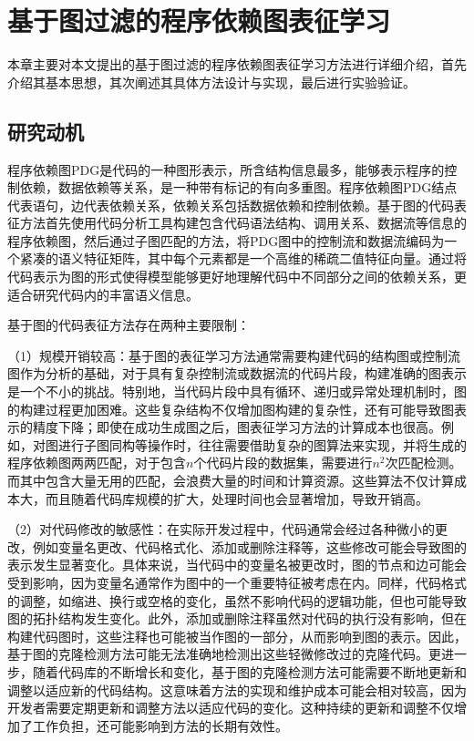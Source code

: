 \chapter{基于图过滤的程序依赖图表征学习}
\label{chap:PDG}
本章主要对本文提出的基于图过滤的程序依赖图表征学习方法进行详细介绍，首先介绍其基本思想，其次阐述其具体方法设计与实现，最后进行实验验证。

\section{研究动机}
\label{sec:PDGMotivation}

程序依赖图PDG是代码的一种图形表示，所含结构信息最多，能够表示程序的控制依赖，数据依赖等关系，是一种带有标记的有向多重图。程序依赖图PDG结点代表语句，边代表依赖关系，依赖关系包括数据依赖和控制依赖。基于图的代码表征方法首先使用代码分析工具构建包含代码语法结构、调用关系、数据流等信息的程序依赖图，然后通过子图匹配的方法，将PDG图中的控制流和数据流编码为一个紧凑的语义特征矩阵，其中每个元素都是一个高维的稀疏二值特征向量。通过将代码表示为图的形式使得模型能够更好地理解代码中不同部分之间的依赖关系，更适合研究代码内的丰富语义信息。

基于图的代码表征方法存在两种主要限制：

（1）规模开销较高：基于图的表征学习方法通常需要构建代码的结构图或控制流图作为分析的基础，对于具有复杂控制流或数据流的代码片段，构建准确的图表示是一个不小的挑战。特别地，当代码片段中具有循环、递归或异常处理机制时，图的构建过程更加困难。这些复杂结构不仅增加图构建的复杂性，还有可能导致图表示的精度下降；即使在成功生成图之后，图表征学习方法的计算成本也很高。例如，对图进行子图同构等操作时，往往需要借助复杂的图算法来实现，并将生成的程序依赖图两两匹配，对于包含$n$个代码片段的数据集，需要进行$n^2$次匹配检测。而其中包含大量无用的匹配，会浪费大量的时间和计算资源。这些算法不仅计算成本大，而且随着代码库规模的扩大，处理时间也会显著增加，导致开销高。

（2）对代码修改的敏感性：在实际开发过程中，代码通常会经过各种微小的更改，例如变量名更改、代码格式化、添加或删除注释等，这些修改可能会导致图的表示发生显著变化。具体来说，当代码中的变量名被更改时，图的节点和边可能会受到影响，因为变量名通常作为图中的一个重要特征被考虑在内。同样，代码格式的调整，如缩进、换行或空格的变化，虽然不影响代码的逻辑功能，但也可能导致图的拓扑结构发生变化。此外，添加或删除注释虽然对代码的执行没有影响，但在构建代码图时，这些注释也可能被当作图的一部分，从而影响到图的表示。因此，基于图的克隆检测方法可能无法准确地检测出这些轻微修改过的克隆代码。更进一步，随着代码库的不断增长和变化，基于图的克隆检测方法可能需要不断地更新和调整以适应新的代码结构。这意味着方法的实现和维护成本可能会相对较高，因为开发者需要定期更新和调整方法以适应代码的变化。这种持续的更新和调整不仅增加了工作负担，还可能影响到方法的长期有效性。

